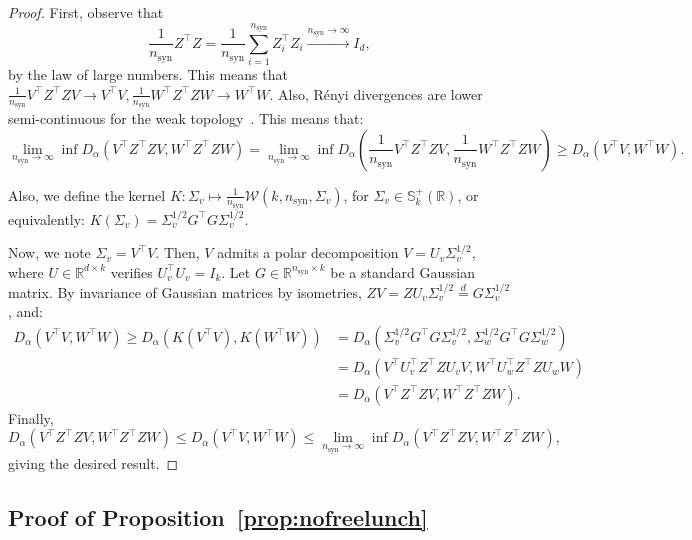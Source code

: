 \documentclass{article}
\theoremstyle{plain}
\theoremstyle{definition}
\theoremstyle{remark}
\begin{document}
\begin{proof}
First, observe that \[\frac{1}{n_{\text{syn}}}Z^\top Z = \frac{1}{n_{\text{syn}}}\sum_{i=1}^{n_{\text{syn}}} Z_i^\top Z_i \overset{n_{\text{syn}} \to \infty}{\to} I_d,\]
by the law of large numbers. This means that $\frac{1}{n_{\text{syn}}}V^\top Z^\top ZV \to V^\top V, \frac{1}{n_{\text{syn}}} W^\top Z^\top Z W \to W^\top W $.
    Also, Rényi divergences are lower semi-continuous for the weak topology~\citep{vanErven2014}.
    This means that:
    \[ \underset{n_{\text{syn}} \to \infty}{\lim} \inf D_\alpha(V^\top Z^\top Z V, W^\top Z^\top Z W) = \underset{n_{\text{syn}} \to \infty}{\lim} \inf D_\alpha\left(\frac{1}{n_{\text{syn}}}V^\top Z^\top Z V, \frac{1}{n_{\text{syn}}}W^\top Z^\top Z W\right) \geq D_\alpha(V^\top V, W^\top W).\]

    Also, we define the kernel $K : \Sigma_v \mapsto \frac{1}{n_{\text{syn}}}\mathcal{W}(k,n_{\text{syn}},\Sigma_v)$, for $\Sigma_v \in \mathbb{S}_k^+(\mathbb{R})$, or equivalently: $K(\Sigma_v) = \Sigma_v^{1/2} G^\top G \Sigma_v^{1/2}$.
    
    Now, we note $\Sigma_v = V^\top V$. Then, $V$ admits a polar decomposition $V = U_v \Sigma_v^{1/2}$, where $U \in \mathbb{R}^{d \times k}$ verifies $U_v^\top U_v = I_k$. Let $G \in \mathbb{R}^{n_{\text{syn}} \times k}$ be a standard Gaussian matrix. By invariance of Gaussian matrices by isometries, $ZV = ZU_v \Sigma_v^{1/2} \overset{d}{=} G\Sigma_v^{1/2}$, and:
    \begin{align*}
        D_\alpha(V^\top V, W^\top W) \geq D_\alpha(K(V^\top V), K(W^\top W)) &= D_\alpha\left(\Sigma_v^{1/2}G^\top G \Sigma_v^{1/2}, \Sigma_w^{1/2}G^\top G \Sigma_w^{1/2} \right)\\
        &= D_\alpha\left(V^\top U_v^\top Z^\top Z U_v V, W^\top U_w^\top Z^\top Z U_w W \right)\\
        &= D_\alpha\left(V^\top Z^\top Z V, W^\top Z^\top Z W \right).
    \end{align*}
    Finally, 
\[D_\alpha(V^\top Z^\top Z V, W^\top Z^\top Z W)\leq  D_\alpha(V^\top V, W^\top W) \leq \underset{n_{\text{syn}} \to \infty}{\lim} \inf D_\alpha(V^\top Z^\top Z V, W^\top Z^\top Z W),\]
giving the desired result.
\end{proof}



\newpage

\subsection{Proof of Proposition~\ref{prop:nofreelunch}}
\label{app:prop-nofreelunch}
\end{document}
